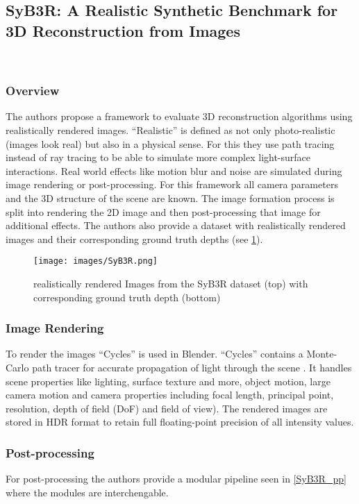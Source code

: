\documentclass[a4paper,cleardoubleempty,BCOR1cm]{scrbook}
\begin{document}
\newpage

\subsection{SyB3R: A Realistic Synthetic Benchmark for 3D Reconstruction from Images}
\cite{syb3r2016}\\
\subsubsection{Overview}
The authors propose a framework to evaluate 3D reconstruction algorithms using realistically rendered images. ``Realistic'' is defined as not only photo-realistic (images look real) but also in a physical sense. For this they use path tracing instead of ray tracing to be able to simulate more complex light-surface interactions. Real world effects like motion blur and noise are simulated during image rendering or post-processing. For this framework all camera parameters and the 3D structure of the scene are known. The image formation process is split into rendering the 2D image and then post-processing that image for additional effects. The authors also provide a dataset with realistically rendered images and their corresponding ground truth depths (see \ref{SyB3R}).
\begin{figure}[h]
	\centering
	\texttt{[image: images/SyB3R.png]}
	\caption{realistically rendered Images from the SyB3R dataset (top) with corresponding ground truth depth (bottom)}
	\label{SyB3R}
\end{figure}

\subsubsection{Image Rendering}
To render the images ``Cycles'' is used in Blender. ``Cycles'' contains a Monte-Carlo path tracer for accurate propagation of light through the scene . It handles scene properties like lighting, surface texture and more, object motion, large camera motion and camera properties including focal length, principal point, resolution, depth of field (DoF) and field of view). The rendered images are stored in HDR format to retain full floating-point precision of all intensity values. 

\subsubsection{Post-processing}
For post-processing the authors provide a modular pipeline seen in \ref{SyB3R_pp} where the modules are interchengable.
\end{document}
